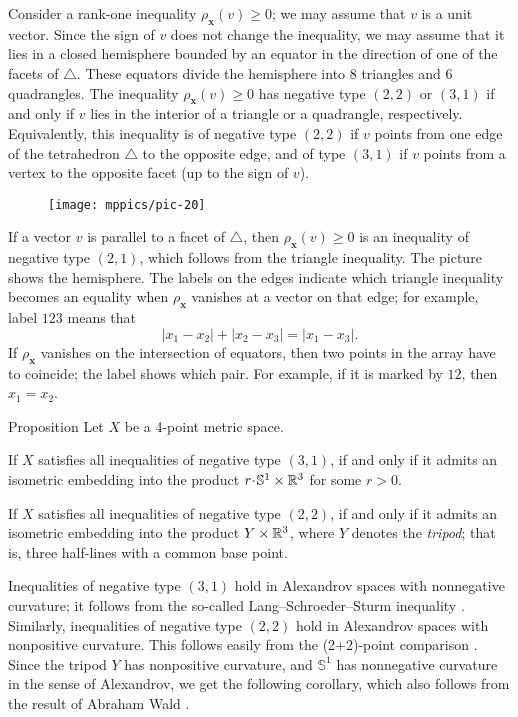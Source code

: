 \documentclass[a4paper,10pt]{article}
\begin{document}
Consider a rank-one inequality $\rho_{\bm{x}}(v)\ge 0$; we may assume that $v$ is a unit vector.
Since the sign of $v$ does not change the inequality, we may assume that it lies in a closed hemisphere bounded by an equator in the direction of one of the facets of $\triangle$.
These equators divide the hemisphere into 8 triangles and 6 quadrangles.
The inequality $\rho_{\bm{x}}(v)\ge 0$ has negative type $(2,2)$ or $(3,1)$
if and only if $v$ lies in the interior of a triangle or a quadrangle, respectively.
Equivalently, this inequality is of negative type $(2,2)$ if $v$ points from one edge of the tetrahedron $\triangle$ to the opposite edge, and of type $(3,1)$ if $v$ points from a vertex to the opposite facet (up to the sign of $v$).

\begin{wrapfigure}{o}{36mm}
\centering
\vskip-3mm
\texttt{[image: mppics/pic-20]}
\vskip-0mm
\end{wrapfigure}

If a vector $v$ is parallel to a facet of $\triangle$, then $\rho_{\bm{x}}(v)\ge 0$ is an inequality of negative type $(2,1)$, which follows from the triangle inequality.
The picture shows the hemisphere.
The labels on the edges indicate which triangle inequality becomes an equality when $\rho_{\bm{x}}$ vanishes at a vector on that edge;
for example, label $123$ means that
\[|x_1-x_2|+|x_2-x_3|=|x_1-x_3|.\]
If $\rho_{\bm{x}}$ vanishes on the intersection of equators, then two points in the array have to coincide;
the label shows which pair.
For example, if it is marked by $12$, then $x_1=x_2$.

\begin{thm}{Proposition}\label{prop:Four-point arrays}
Let $X$ be a 4-point metric space.

If $X$ satisfies all inequalities of negative type $(3, 1)$, if and only if it admits an isometric embedding into the product $r\cdot \mathbb{S}^1\times\RR^3$ for some $r>0$.

If $X$ satisfies all inequalities of negative type $(2, 2)$, if and only if it admits an isometric embedding into the product $Y\times\mathbb{R}^3$, where $Y$ denotes the \emph{tripod};
that is, three half-lines with a common base point.
\end{thm}

Inequalities of negative type $(3, 1)$ hold in Alexandrov spaces with nonnegative curvature; it follows from the so-called Lang--Schroeder--Sturm inequality \cite{lang-schroeder, sturm}.
Similarly, inequalities of negative type $(2, 2)$ hold in Alexandrov spaces with nonpositive curvature.
This follows easily from the (2+2)-point comparison \cite[9.5]{AKP-2024}.
Since the tripod $Y$ has nonpositive curvature, and $\mathbb{S}^1$ has nonnegative curvature in the sense of Alexandrov, we get the following corollary, which also follows from the result of Abraham Wald \cite[§ 7]{wald}.
\end{document}
